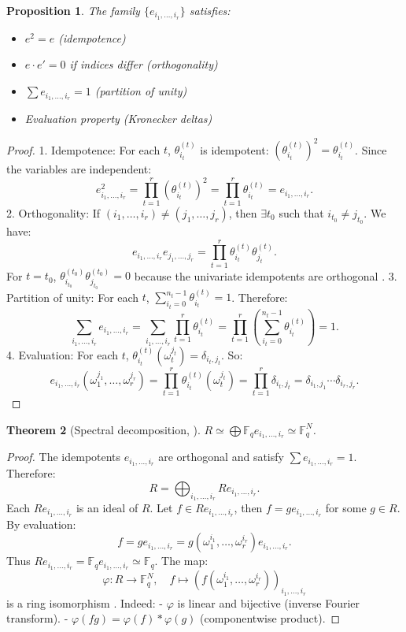 \documentclass[10pt,twocolumn]{IEEEtran}
\theoremstyle{plain}
\newtheorem{thm}{Theorem}[section]
\newtheorem{prop}[thm]{Proposition}
\theoremstyle{definition}
\newcommand{\Fq}{\mathbb{F}_q}
\begin{document}
\begin{prop}
The family $\{e_{i_1,\dots,i_r}\}$ satisfies:
\begin{itemize}
\item $e^2 = e$ (idempotence)
\item $e \cdot e' = 0$ if indices differ (orthogonality)
\item $\sum e_{i_1,\dots,i_r} = 1$ (partition of unity)
\item Evaluation property (Kronecker deltas)
\end{itemize}
\end{prop}
\begin{proof}
1. Idempotence: For each $t$, $\theta_{i_t}^{(t)}$ is idempotent: $(\theta_{i_t}^{(t)})^2 = \theta_{i_t}^{(t)}$. Since the variables are independent:
   \[
   e_{i_1,\dots,i_r}^2 = \prod_{t=1}^r (\theta_{i_t}^{(t)})^2 = \prod_{t=1}^r \theta_{i_t}^{(t)} = e_{i_1,\dots,i_r}.
   \]
2. Orthogonality: If $(i_1,\dots,i_r) \neq (j_1,\dots,j_r)$, then $\exists t_0$ such that $i_{t_0} \neq j_{t_0}$. We have:
   \[
   e_{i_1,\dots,i_r} e_{j_1,\dots,j_r} = \prod_{t=1}^r \theta_{i_t}^{(t)} \theta_{j_t}^{(t)}.
   \]
   For $t = t_0$, $\theta_{i_{t_0}}^{(t_0)} \theta_{j_{t_0}}^{(t_0)} = 0$ because the univariate idempotents are orthogonal \cite{macwilliams1977}.
3. Partition of unity: For each $t$, $\sum_{i_t=0}^{n_t-1} \theta_{i_t}^{(t)} = 1$. Therefore:
   \[
   \sum_{i_1,\dots,i_r} e_{i_1,\dots,i_r} = \sum_{i_1,\dots,i_r} \prod_{t=1}^r \theta_{i_t}^{(t)} = \prod_{t=1}^r \left( \sum_{i_t=0}^{n_t-1} \theta_{i_t}^{(t)} \right) = 1.
   \]
4. Evaluation: For each $t$, $\theta_{i_t}^{(t)}(\omega_t^{j_t}) = \delta_{i_t,j_t}$. So:
   \[
   e_{i_1,\dots,i_r}(\omega_1^{j_1},\dots,\omega_r^{j_r}) = \prod_{t=1}^r \theta_{i_t}^{(t)}(\omega_t^{j_t}) = \prod_{t=1}^r \delta_{i_t,j_t} = \delta_{i_1,j_1} \cdots \delta_{i_r,j_r}.
   \]
\end{proof}

\begin{thm}[Spectral decomposition, \cite{blahut2003}]\label{thm:decomp}
$R \simeq \bigoplus \Fq e_{i_1,\dots,i_r} \simeq \Fq^N$.
\end{thm}
\begin{proof}
The idempotents $e_{i_1,\dots,i_r}$ are orthogonal and satisfy $\sum e_{i_1,\dots,i_r} = 1$. Therefore:
\[
R = \bigoplus_{i_1,\dots,i_r} R e_{i_1,\dots,i_r}.
\]
Each $R e_{i_1,\dots,i_r}$ is an ideal of $R$. Let $f \in R e_{i_1,\dots,i_r}$, then $f = g e_{i_1,\dots,i_r}$ for some $g \in R$. By evaluation:
\[
f = g e_{i_1,\dots,i_r} = g(\omega_1^{i_1},\dots,\omega_r^{i_r}) e_{i_1,\dots,i_r}.
\]
Thus $R e_{i_1,\dots,i_r} = \Fq e_{i_1,\dots,i_r} \simeq \Fq$. The map:
\[
\varphi: R \to \Fq^N,\quad f \mapsto (f(\omega_1^{i_1},\dots,\omega_r^{i_r}))_{i_1,\dots,i_r}
\]
is a ring isomorphism . Indeed:
- $\varphi$ is linear and bijective (inverse Fourier transform).
- $\varphi(fg) = \varphi(f) * \varphi(g)$ (componentwise product).
\end{proof}
\end{document}
